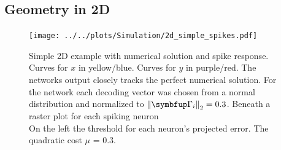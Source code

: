 \subsection{Geometry in 2D}
\begin{figure}[h!]
	\centering
	\texttt{[image: ../../plots/Simulation/2d\_simple\_spikes.pdf]}
	\caption{Simple 2D example with numerical solution and spike response. Curves for $x$ in yellow/blue. Curves for $y$ in purple/red. The networks output closely tracks the perfect numerical solution. For the network each decoding vector was chosen from a normal distribution and normalized to $\left\lVert\bmu{\Gamma}_i\right\rVert_2 =0.3$. Beneath a raster plot for each spiking neuron \\ On the left the threshold for each neuron's projected error. The quadratic cost $\mu$ = 0.3.}
	\label{fig:sim_res_geometric}
\end{figure}


